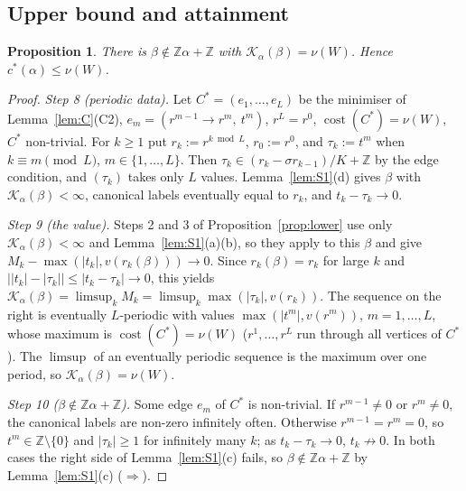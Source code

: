\documentclass[11pt]{amsart}
\newtheorem{proposition}[theorem]{Proposition}
\theoremstyle{definition}
\theoremstyle{remark}
\newcommand{\Z}{\mathbb{Z}}
\newcommand{\KL}{\mathcal{K}}
\newcommand{\cost}{\operatorname{cost}}
\begin{document}
\subsection{Upper bound and attainment}\label{subsec:upper}
\begin{proposition}\label{prop:upper}
There is $\beta\notin\Z\alpha+\Z$ with $\KL_\alpha(\beta)=\nu(W)$. Hence $c^*(\alpha)\le\nu(W)$.
\end{proposition}

\begin{proof}
\emph{Step 8 (periodic data).} Let $C^*=(e_1,\dots,e_L)$ be the minimiser of Lemma~\ref{lem:C}(C2),
$e_m=(r^{m-1}\to r^m,\ t^m)$, $r^L=r^0$, $\cost(C^*)=\nu(W)$, $C^*$ non-trivial. For $k\ge1$ put
$r_k:=r^{k\bmod L}$, $r_0:=r^0$, and $\tau_k:=t^m$ when $k\equiv m\pmod L$, $m\in\{1,\dots,L\}$. Then
$\tau_k\in(r_k-\sigma r_{k-1})/K+\Z$ by the edge condition, and $(\tau_k)$ takes only $L$ values. Lemma~\ref{lem:S1}(d)
gives $\beta$ with $\KL_\alpha(\beta)<\infty$, canonical labels eventually equal to $r_k$, and $t_k-\tau_k\to0$.

\emph{Step 9 (the value).} Steps 2 and 3 of Proposition~\ref{prop:lower} use only $\KL_\alpha(\beta)<\infty$ and
Lemma~\ref{lem:S1}(a)(b), so they apply to this $\beta$ and give $M_k-\max(|t_k|,v(r_k(\beta)))\to0$. Since
$r_k(\beta)=r_k$ for large $k$ and $\bigl||t_k|-|\tau_k|\bigr|\le|t_k-\tau_k|\to0$, this yields
$\KL_\alpha(\beta)=\limsup_kM_k=\limsup_k\max(|\tau_k|,v(r_k))$. The sequence on the right is eventually $L$-periodic with values
$\max(|t^m|,v(r^m))$, $m=1,\dots,L$, whose maximum is $\cost(C^*)=\nu(W)$ ($r^1,\dots,r^L$ run through all vertices of
$C^*$). The $\limsup$ of an eventually periodic sequence is the maximum over one period, so
$\KL_\alpha(\beta)=\nu(W)$.

\emph{Step 10 ($\beta\notin\Z\alpha+\Z$).} Some edge $e_m$ of $C^*$ is non-trivial. If $r^{m-1}\ne0$ or $r^m\ne0$, the
canonical labels are non-zero infinitely often. Otherwise $r^{m-1}=r^m=0$, so $t^m\in\Z\setminus\{0\}$ and
$|\tau_k|\ge1$ for infinitely many $k$; as $t_k-\tau_k\to0$, $t_k\not\to0$. In both cases the right side of
Lemma~\ref{lem:S1}(c) fails, so $\beta\notin\Z\alpha+\Z$ by Lemma~\ref{lem:S1}(c) ($\Rightarrow$).
\end{proof}
\end{document}
